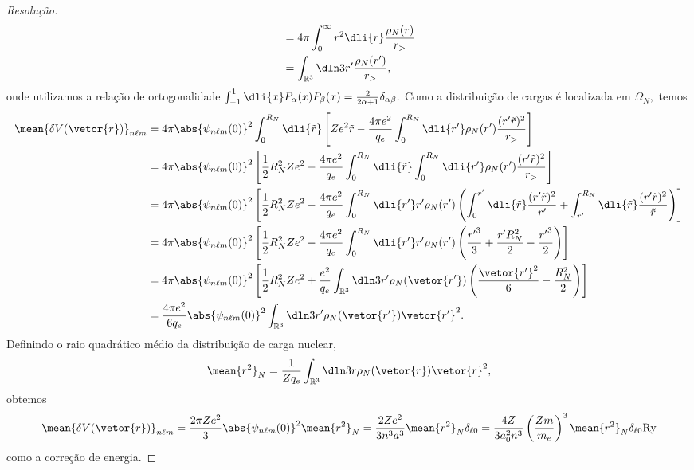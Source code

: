 \begin{proof}[Resolução]
\begin{align*}
      &= 4\pi \int_0^\infty {r}^2 \dli{r} \frac{\rho_N(r)}{r_>}\\
      &= \int_{\mathbb{R}^3} \dln3{r'} \frac{\rho_N(r')}{r_>},
   \end{align*}
   onde utilizamos a relação de ortogonalidade \(\int_{-1}^1 \dli{x} P_\alpha(x) P_\beta(x) = \frac{2}{2\alpha+ 1} \delta_{\alpha \beta}.\) Como a distribuição de cargas é localizada em \(\Omega_N,\) temos
   \begin{align*}
      \mean{\delta V(\vetor{r})}_{n\ell m} &= 4\pi \abs{\psi_{n\ell m}(0)}^2 \int_0^{R_N}\dli{\tilde{r}}\left[Ze^2 \tilde{r} - \frac{4\pi e^2}{q_e} \int_0^{R_N}\dli{r'} \rho_N(r') \frac{(r' \tilde{r})^2}{r_>}\right]\\
                                           &= 4\pi \abs{\psi_{n\ell m}(0)}^2 \left[\frac12 R_N^2 Z e^2 - \frac{4\pi e^2}{q_e} \int_0^{R_N} \dli{\tilde{r}} \int_0^{R_N} \dli{r'} \rho_N(r') \frac{(r' \tilde{r})^2}{r_>}\right]\\
                                           &= 4\pi \abs{\psi_{n\ell m}(0)}^2 \left[\frac12 R_N^2 Z e^2 - \frac{4\pi e^2}{q_e} \int_0^{R_N} \dli{r'} r' \rho_N(r')\left(\int_0^{r'}\dli{\tilde{r}}\frac{(r' \tilde{r})^2}{r'} + \int_{r'}^{R_N} \dli{\tilde{r}}\frac{(r' \tilde{r})^2}{\tilde{r}}\right)\right]\\
                                           &= 4\pi \abs{\psi_{n\ell m}(0)}^2 \left[\frac12 R_N^2Ze^2 - \frac{4\pi e^2}{q_e}\int_0^{R_N}\dli{r'} r' \rho_N(r') \left(\frac{{r'}^3}{3} + \frac{r' R_N^2}{2} - \frac{{r'}^3}{2}\right)\right]\\
                                           &= 4\pi \abs{\psi_{n\ell m}(0)}^2 \left[\frac12 R_N^2 Z e^2 + \frac{e^2}{q_e} \int_{\mathbb{R}^3} \dln3{r'} \rho_N(\vetor{r'}) \left( \frac{\vetor{r'}^2}{6} - \frac{R_N^2}{2}\right)\right]\\
                                           &= \frac{4\pi e^2}{6 q_e}\abs{\psi_{n\ell m}(0)}^2  \int_{\mathbb{R}^3}\dln3{r'} \rho_N(\vetor{r'}) \vetor{r'}^2.
   \end{align*}
   Definindo o raio quadrático médio da distribuição de carga nuclear,
   \begin{equation*}
      \mean{r^2}_N = \frac{1}{Z q_e}\int_{\mathbb{R}^3} \dln3r \rho_N(\vetor{r}) \vetor{r}^2,
   \end{equation*}
   obtemos
   \begin{align*}
      \mean{\delta V(\vetor{r})}_{n\ell m} = \frac{2\pi Ze^2}{3}\abs{\psi_{n\ell m}(0)}^2 \mean{r^2}_N
                                           = \frac{2Z e^2}{3n^3 a^3} \mean{r^2}_N \delta_{\ell 0}
                                           = \frac{4Z}{3 a_0^2 n^3}\left(\frac{Z m}{m_e}\right)^3 \mean{r^2}_N \delta_{\ell 0} \mathrm{Ry}
   \end{align*}
   como a correção de energia.


\end{proof}
